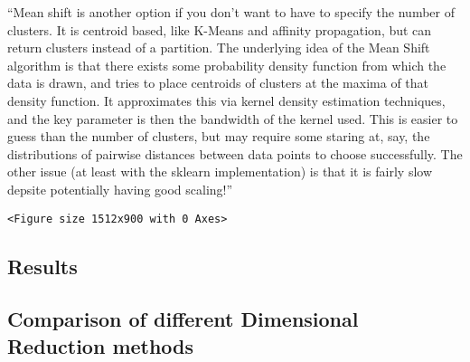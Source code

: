 \documentclass[11pt]{article}
\begin{document}
    ``Mean shift is another option if you don't want to have to specify the
number of clusters. It is centroid based, like K-Means and affinity
propagation, but can return clusters instead of a partition. The
underlying idea of the Mean Shift algorithm is that there exists some
probability density function from which the data is drawn, and tries to
place centroids of clusters at the maxima of that density function. It
approximates this via kernel density estimation techniques, and the key
parameter is then the bandwidth of the kernel used. This is easier to
guess than the number of clusters, but may require some staring at, say,
the distributions of pairwise distances between data points to choose
successfully. The other issue (at least with the sklearn implementation)
is that it is fairly slow depsite potentially having good scaling!''




    
    \begin{verbatim}
<Figure size 1512x900 with 0 Axes>
    \end{verbatim}

    
    \hypertarget{results}{%
\subsection{Results}\label{results}}

    \hypertarget{comparison-of-different-dimensional-reduction-methods}{%
\subsection{Comparison of different Dimensional Reduction
methods}\label{comparison-of-different-dimensional-reduction-methods}}




    \begin{center}
    \end{center}
    { \hspace*{\fill} \\}
    
    \begin{center}
    \end{center}
    { \hspace*{\fill} \\}
    
\end{document}
